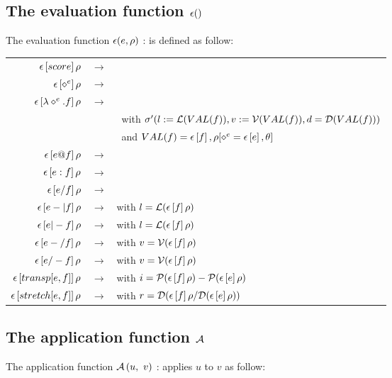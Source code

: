 \documentclass[10pt,a4paper,frenchb]{article}
\makeatletter
\newcommand{\evaltable}[1][$\rightarrow$]	  {\begin{center} \begin{tabular*}{\linewidth}{rc@{ #1 }l}}
\newcommand{\evaltablend}  		{\end{tabular*}\end{center}}
\newcommand{\ra}					{\ensuremath{\rightarrow}}
\makeatother
\begin{document}
\subsection{The evaluation function $\epsilon()$}
\label{evalsimple}

The evaluation function $\epsilon(e,\rho)$ : \sdomain{\expr}{\env}{\val} is defined as follow:

\evaltable[]
 \hline
 $\epsilon\left[score\right]\rho$				& \ra & \sevalScore{score} \\
 $\epsilon\left[\diamond^e\right]\rho$ 				& \ra & \sevalVar{e} \\
 $\epsilon\left[\lambda \diamond^e.f\right]\rho$ 	& \ra & \sevalLambda{e}{f}{\envsym}{\bounds'} \\
 			& & \ with $\sigma'(l:=\mathcal L(VAL(f)), v:=\mathcal V(VAL(f)), d=\mathcal D(VAL(f)))$ \\
			& & \ and $VAL(f) = \epsilon\left[f\right],\rho[\diamond^e= \epsilon\left[e\right], \theta]$\\
 $\epsilon\left[e @ f\right]\rho$ 	& \ra & \sevalApply{e}{f} \\
 $\epsilon\left[e : f\right]\rho$		& \ra & \sevalSeq{e}{f} \\
 $\epsilon\left[e / f\right]\rho$ 		& \ra & \sevalMix{e}{f} \\
 $\epsilon\left[e -| f\right]\rho$ 			& \ra & \sevalHead{e}{l} with $l = \mathcal L(\epsilon\left[f\right]\rho)$ \\

 $\epsilon\left[e |- f\right]\rho$ 		& \ra & \sevalTail{e}{l} 		with $l = \mathcal L(\epsilon\left[f\right]\rho)$ \\
 $\epsilon\left[e -/ f\right]\rho$ 		& \ra & \sevalTop{e}{v} 		with $v = \mathcal V(\epsilon\left[f\right]\rho)$ \\
 $\epsilon\left[e /- f\right]\rho$ 		& \ra & \sevalBottom{e}{v} 	with $v = \mathcal V(\epsilon\left[f\right]\rho)$ \\

 $\epsilon\left[transp[e,f]\right]\rho$ 		& \ra & \sevalTransp{e}{i} 	with $i = \mathcal P(\epsilon\left[f\right]\rho) - \mathcal P(\epsilon\left[e\right]\rho) $ \\
 $\epsilon\left[stretch[e,f]\right]\rho$ 	& \ra & \sevalStretch{e}{r} 	with $r = \mathcal D(\epsilon\left[f\right]\rho / \mathcal D(\epsilon\left[e\right]\rho))$ \\
 \hline
\evaltablend

\subsection{The application function $\mathcal A{}$}
The application function $\mathcal A\left(u,\ v\right)$ : \sdomain{\val}{\val}{\val} applies $u$ to $v$ as follow:
\end{document}
